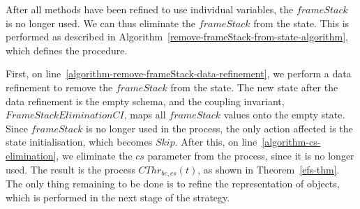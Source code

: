After all methods have been refined to use individual variables, the
$frameStack$ is no longer used.
We can thus eliminate the $frameStack$ from the state. 
This is performed as described in
Algorithm~\ref{remove-frameStack-from-state-algorithm}, which defines
the  procedure.

\begin{algorithm}
  \begin{algorithmic}
    \State {}
    \label{algorithm-remove-frameStack-data-refinement}
    \State {}
    \label{algorithm-cs-elimination}
  \end{algorithmic}
  \caption{}
  \label{remove-frameStack-from-state-algorithm}
\end{algorithm}

First, on line~\ref{algorithm-remove-frameStack-data-refinement}, we
perform a data refinement to remove the $frameStack$ from the state.
The new state after the data refinement is the empty schema, and the
coupling invariant, $FrameStackEliminationCI$, maps all $frameStack$
values onto the empty state.
Since $frameStack$ is no longer used in the process, the only action
affected is the state initialisation, which becomes $Skip$.
After this, on line~\ref{algorithm-cs-elimination}, we eliminate the
$cs$ parameter from the process, since it is no longer used.
The result is the process $CThr_{bc,cs}(t)$, as shown in
Theorem~\ref{efs-thm}.
The only thing remaining to be done is to refine the representation of
objects, which is performed in the next stage of the strategy.
